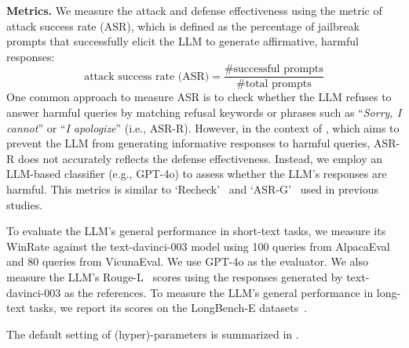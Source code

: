 
{\bf Metrics.} We measure the attack and defense effectiveness using the metric of  
attack success rate (ASR), which is defined as the percentage of jailbreak prompts that successfully elicit the LLM to generate affirmative, harmful responses:
\begin{equation}
    \textrm{attack success rate (ASR)} = \frac{\textrm{\# successful prompts}}{\textrm{\# total prompts}}
\end{equation}
One common approach to measure ASR is to check whether the LLM refuses to answer harmful queries by matching refusal keywords or phrases such as ``{\em Sorry, I cannot}'' or ``{\em I apologize}'' (i.e., ASR-R). However, in the context of \rkv, which aims to prevent the LLM from generating informative responses to harmful queries, ASR-R does not accurately reflects the defense effectiveness.
Instead, we employ an LLM-based classifier (e.g., GPT-4o) to assess whether the LLM's responses are harmful. This metrics is similar to  `Recheck'~\citep{autodan} and `ASR-G'~\citep{cold-attack} used in previous studies.

To evaluate the LLM's general performance in short-text tasks, we measure its WinRate against the text-davinci-003 model using 100 queries from AlpacaEval and 80 queries from VicunaEval. We use GPT-4o as the evaluator. We also measure the LLM's Rouge-L~\citep{rouge} scores using the responses generated by text-davinci-003 as the references. To measure the LLM's general performance in long-text tasks, we report its scores on the LongBench-E datasets~\citep{longbench}.

The default setting of (hyper)-parameters is summarized in .







